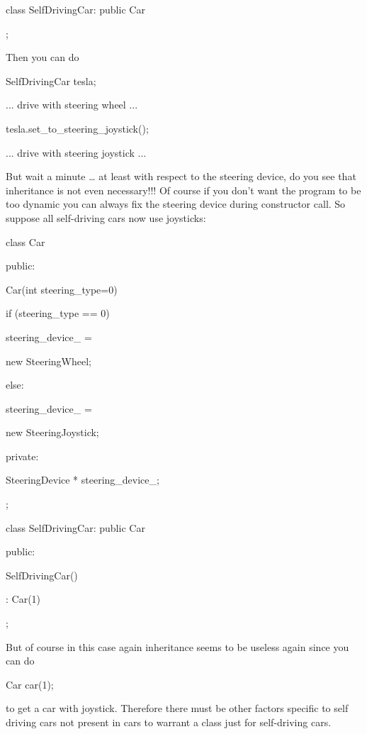 class SelfDrivingCar: public Car

{};

Then you can do

SelfDrivingCar tesla;

... drive with steering wheel ...

tesla.set_to_steering_joystick();

... drive with steering joystick ...

But wait a minute \ldots{} at least with respect to the steering device,
do you see that inheritance is not even necessary!!! Of course if you
don't want the program to be too dynamic you can always fix the steering
device during constructor call. So suppose all self-driving cars now use
joysticks:

class Car

{

public:

Car(int steering_type=0)

{

if (steering_type == 0)

steering_device_ =

new SteeringWheel;

else:

steering_device_ =

new SteeringJoystick;

}

private:

SteeringDevice * steering_device_;

};

class SelfDrivingCar: public Car

{

public:

SelfDrivingCar()

: Car(1)

{}

};

But of course in this case again inheritance seems to be useless again
since you can do

Car car(1);

to get a car with joystick. Therefore there must be other factors
specific to self driving cars not present in cars to warrant a class
just for self-driving cars.


